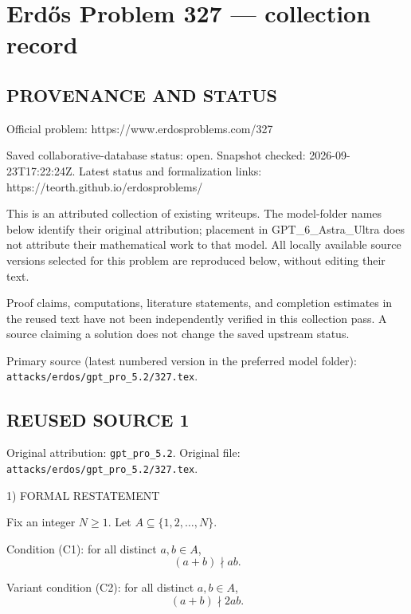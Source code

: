\section*{Erd\H{o}s Problem 327 --- collection record}

\subsection*{PROVENANCE AND STATUS}
Official problem: https://www.erdosproblems.com/327

Saved collaborative-database status: open.
Snapshot checked: 2026-09-23T17:22:24Z.
Latest status and formalization links: https://teorth.github.io/erdosproblems/

This is an attributed collection of existing writeups. The model-folder names below identify their original attribution; placement in GPT\_6\_Astra\_Ultra does not attribute their mathematical work to that model. All locally available source versions selected for this problem are reproduced below, without editing their text.

Proof claims, computations, literature statements, and completion estimates in the reused text have not been independently verified in this collection pass. A source claiming a solution does not change the saved upstream status.

Primary source (latest numbered version in the preferred model folder): \texttt{attacks/erdos/gpt\_pro\_5.2/327.tex}.

\subsection*{REUSED SOURCE 1}
Original attribution: \texttt{gpt\_pro\_5.2}.
Original file: \texttt{attacks/erdos/gpt\_pro\_5.2/327.tex}.


1) FORMAL RESTATEMENT

Fix an integer $N\ge 1$.
Let $A\subseteq\{1,2,\dots,N\}$.

Condition (C1): for all distinct $a,b\in A$,
\[
(a+b)\nmid ab.
\]

Variant condition (C2): for all distinct $a,b\in A$,
\[
(a+b)\nmid 2ab.
\]

